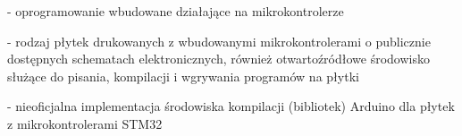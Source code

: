 \begin{description}[labelwidth=*]
  \item [Firmware] - oprogramowanie wbudowane działające na mikrokontrolerze
  
  \item [Arduino] - rodzaj płytek drukowanych z wbudowanymi mikrokontrolerami o publicznie dostępnych schematach elektronicznych, również otwartoźródłowe środowisko służące do pisania, kompilacji i wgrywania programów na płytki
  
  \item [STM32duino] - nieoficjalna implementacja środowiska kompilacji (bibliotek) Arduino dla płytek z mikrokontrolerami STM32
  
\end{description}
